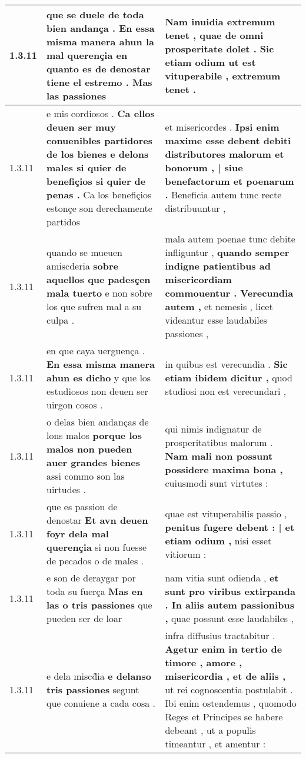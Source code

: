 \begin{tabular}{|p{1cm}|p{6.5cm}|p{6.5cm}|}
1.3.11 & que se duele de toda bien andança . \textbf{ En essa misma manera ahun la mal querençia } en quanto es de denostar tiene el estremo . Mas las passiones & Nam inuidia extremum tenet , \textbf{ quae de omni prosperitate dolet . Sic etiam odium ut est vituperabile , } extremum tenet . \\\hline
1.3.11 & e mis cordiosos . \textbf{ Ca ellos deuen ser muy conuenibles partidores de los bienes e delons males si quier de benefiçios si quier de penas . } Ca los benefiçios estonçe son derechamente partidos & et misericordes . \textbf{ Ipsi enim maxime esse debent debiti distributores malorum et bonorum , | siue benefactorum et poenarum . } Beneficia autem tunc recte distribuuntur , \\\hline
1.3.11 & quando se mueuen amiscderia \textbf{ sobre aquellos que padesçen mala tuerto } e non sobre los que sufren mal a su culpa . & mala autem poenae tunc debite infliguntur , \textbf{ quando semper indigne patientibus ad misericordiam commouentur . Verecundia autem , } et nemesis , licet videantur esse laudabiles passiones , \\\hline
1.3.11 & en que caya uerguença . \textbf{ En essa misma manera ahun es dicho } y que los estudiosos non deuen ser uirgon cosos . & in quibus est verecundia . \textbf{ Sic etiam ibidem dicitur , } quod studiosi non est verecundari , \\\hline
1.3.11 & o delas bien andanças de lons malos \textbf{ porque los malos non pueden auer grandes bienes } assi commo son las uirtudes . & qui nimis indignatur de prosperitatibus malorum . \textbf{ Nam mali non possunt possidere maxima bona , } cuiusmodi sunt virtutes : \\\hline
1.3.11 & que es passion de denostar \textbf{ Et avn deuen foyr dela mal querençia } si non fuesse de pecados o de males . & quae est vituperabilis passio , \textbf{ penitus fugere debent : | et etiam odium , } nisi esset vitiorum : \\\hline
1.3.11 & e son de deraygar por toda su fuerça \textbf{ Mas en las o tris passiones } que pueden ser de loar & nam vitia sunt odienda , \textbf{ et sunt pro viribus extirpanda . In aliis autem passionibus , } quae possunt esse laudabiles , \\\hline
1.3.11 & e dela miscd̃ia \textbf{ e delanso tris passiones } segunt que conuiene a cada cosa . & infra diffusius tractabitur . \textbf{ Agetur enim in tertio de timore , amore , misericordia , et de aliis , } ut rei cognoscentia postulabit . Ibi enim ostendemus , quomodo Reges et Principes se habere debeant , ut a populis timeantur , et amentur : \\\hline

\end{tabular}
